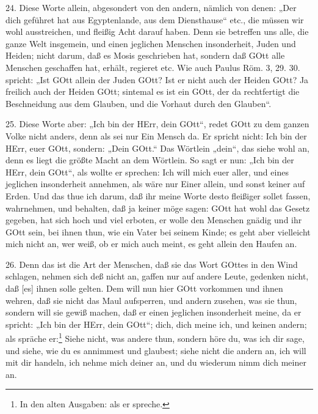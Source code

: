 24. Diese Worte allein, abgesondert von den andern, nämlich von denen: „Der dich geführet hat aus Egyptenlande, aus dem Diensthause“ etc., die müssen wir wohl ausstreichen, und fleißig Acht darauf haben. Denn sie betreffen uns alle, die ganze Welt insgemein, und einen jeglichen Menschen insonderheit, Juden und Heiden; nicht darum, daß es Mosis geschrieben hat, sondern daß GOtt alle Menschen geschaffen hat, erhält, regieret etc. Wie auch Paulus Röm. 3, 29. 30. spricht: „Ist GOtt allein der Juden GOtt? Ist er nicht auch der Heiden GOtt? Ja freilich auch der Heiden GOtt; sintemal es ist ein GOtt, der da rechtfertigt die Beschneidung aus dem Glauben, und die Vorhaut durch den Glauben“.

25. Diese Worte aber: „Ich bin der HErr, dein GOtt“, redet GOtt zu dem ganzen Volke
nicht anders, denn als sei nur Ein Mensch da. Er spricht nicht: Ich bin der HErr, euer GOtt, sondern: „Dein GOtt.“ Das Wörtlein „dein“, das siehe wohl an, denn es liegt die größte Macht an dem Wörtlein. So sagt er nun: „Ich bin der HErr, dein GOtt“, als wollte er sprechen: Ich will mich euer aller, und eines jeglichen insonderheit annehmen, als wäre nur Einer allein, und sonst keiner auf Erden. Und das thue ich darum, daß ihr meine Worte desto fleißiger sollet fassen, wahrnehmen, und behalten, daß ja keiner möge sagen: GOtt hat wohl das Gesetz gegeben, hat sich hoch und viel erboten, er wolle den Menschen gnädig und ihr GOtt sein, bei ihnen thun, wie ein Vater bei seinem Kinde; es geht aber vielleicht mich nicht an, wer weiß, ob er mich auch meint, es geht allein den Haufen an.

26. Denn das ist die Art der Menschen, daß sie das Wort GOttes in den Wind schlagen, nehmen sich deß nicht an, gaffen nur auf andere Leute, gedenken nicht, daß [es] ihnen solle gelten. Dem will nun hier GOtt vorkommen und ihnen wehren, daß sie nicht das Maul aufsperren, und andern zusehen, was sie thun, sondern will sie gewiß machen, daß er einen jeglichen insonderheit meine, da er spricht: „Ich bin der HErr, dein GOtt“; dich, dich meine ich, und keinen andern; als spräche er:\footnote{In den alten Ausgaben: als er spreche.} Siehe nicht, was andere thun, sondern höre du, was ich dir sage, und siehe, wie du es annimmest und glaubest; siehe nicht die andern an, ich will mit dir handeln, ich nehme mich deiner an, und du wiederum nimm dich meiner an.

